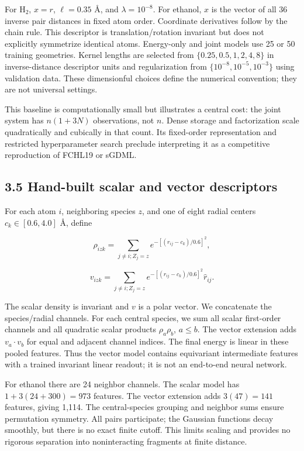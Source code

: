\documentclass[
  11pt,
  a4paper,
]{article}
\begin{document}
For H\(_2\), \(x=r\), \(\ell=0.35\) Å, and \(\lambda=10^{-8}\). For
ethanol, \(x\) is the vector of all 36 inverse pair distances in fixed
atom order. Coordinate derivatives follow by the chain rule. This
descriptor is translation/rotation invariant but does not explicitly
symmetrize identical atoms. Energy-only and joint models use 25 or 50
training geometries. Kernel lengths are selected from
\(\{0.25,0.5,1,2,4,8\}\) in inverse-distance descriptor units and
regularization from \(\{10^{-8},10^{-5},10^{-3}\}\) using validation
data. These dimensionful choices define the numerical convention; they
are not universal settings.

This baseline is computationally small but illustrates a central cost:
the joint system has \(n(1+3N)\) observations, not \(n\). Dense storage
and factorization scale quadratically and cubically in that count. Its
fixed-order representation and restricted hyperparameter search preclude
interpreting it as a competitive reproduction of FCHL19 or sGDML.

\hypertarget{hand-built-scalar-and-vector-descriptors}{%
\subsection{3.5 Hand-built scalar and vector
descriptors}\label{hand-built-scalar-and-vector-descriptors}}

For each atom \(i\), neighboring species \(z\), and one of eight radial
centers \(c_k\in[0.6,4.0]\) Å, define

\[\rho_{izk}=\sum_{j\ne i;Z_j=z}e^{-[(r_{ij}-c_k)/0.6]^2},\]

\[v_{izk}=\sum_{j\ne i;Z_j=z}e^{-[(r_{ij}-c_k)/0.6]^2}\hat r_{ij}.\]

The scalar density is invariant and \(v\) is a polar vector. We
concatenate the species/radial channels. For each central species, we
sum all scalar first-order channels and all quadratic scalar products
\(\rho_a\rho_b\), \(a\le b\). The vector extension adds \(v_a\cdot v_b\)
for equal and adjacent channel indices. The final energy is linear in
these pooled features. Thus the vector model contains equivariant
intermediate features with a trained invariant linear readout; it is not
an end-to-end neural network.

For ethanol there are 24 neighbor channels. The scalar model has
\(1+3(24+300)=973\) features. The vector extension adds \(3(47)=141\)
features, giving 1,114. The central-species grouping and neighbor sums
ensure permutation symmetry. All pairs participate; the Gaussian
functions decay smoothly, but there is no exact finite cutoff. This
limits scaling and provides no rigorous separation into noninteracting
fragments at finite distance.
\end{document}
